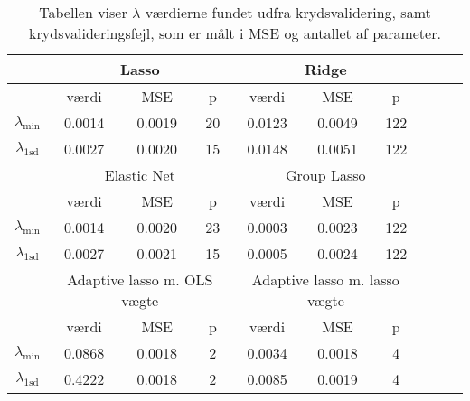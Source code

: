 \begin{table}
\center
\begin{tabular}{cccc | cccccc}
\toprule
 &  \multicolumn{3}{c}{Lasso} &  \multicolumn{3}{c}{Ridge}  \\ \midrule
 & værdi & MSE & p & 	værdi & MSE & p \\
 $\lambda_{\min}$ &0.0014& 0.0019 & 20 	& 0.0123 &  0.0049 & 122 \\ 
 $\lambda_{1 \text{sd}}$ & 0.0027 & 0.0020 & 15 & 0.0148 & 0.0051 & 122  \\ \bottomrule \toprule
  &  \multicolumn{3}{c}{Elastic Net}  &  \multicolumn{3}{c}{Group Lasso}  \\ \midrule
 & værdi & MSE & p & værdi & MSE & p \\
 $\lambda_{\min}$ & 0.0014 & 0.0020 & 23 & 0.0003 & 0.0023  & 122\\
  $\lambda_{1\text{sd}}$ & 0.0027 & 0.0021 & 15 & 0.0005 & 0.0024 & 122 \\  \bottomrule \toprule
 &  \multicolumn{3}{c}{Adaptive lasso m. OLS vægte}  &  \multicolumn{3}{c}{Adaptive lasso m. lasso vægte}  \\ \midrule
  & værdi & MSE & p & værdi & MSE & p \\
 $\lambda_{\min}$  & 0.0868 & 0.0018 & 2 & 0.0034 & 0.0018 & 4   \\
 $\lambda_{1\text{sd}}$ & 0.4222 & 0.0018 & 2 & 0.0085 & 0.0019 & 4  \\ \bottomrule
 \end{tabular}
\caption{Tabellen viser $\lambda$ værdierne fundet udfra krydsvalidering, samt krydsvalideringsfejl, som er målt i MSE og antallet af parameter.} \label{tab:cv_tab}
\end{table}
